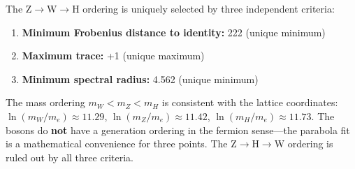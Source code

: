 The Z$\to$W$\to$H ordering is uniquely selected by three independent criteria:
\begin{enumerate}
\item \textbf{Minimum Frobenius distance to identity:} 222 (unique minimum)
\item \textbf{Maximum trace:} +1 (unique maximum)
\item \textbf{Minimum spectral radius:} 4.562 (unique minimum)
\end{enumerate}

The mass ordering $m_W < m_Z < m_H$ is consistent with the lattice coordinates: $\ln(m_W/m_e) \approx 11.29$, $\ln(m_Z/m_e) \approx 11.42$, $\ln(m_H/m_e) \approx 11.73$. The bosons do \textbf{not} have a generation ordering in the fermion sense---the parabola fit is a mathematical convenience for three points. The Z$\to$H$\to$W ordering is ruled out by all three criteria.
